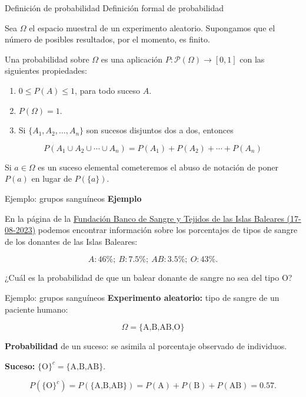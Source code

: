\documentclass[
  ignorenonframetext,
  aspectratio=169]{beamer}
\providecommand{\tightlist}{%
  \setlength{\itemsep}{0pt}\setlength{\parskip}{0pt}}\usepackage{longtable,booktabs,array}
\begin{document}
\begin{frame}{Definición de probabilidad}
\label{definiciuxf3n-de-probabilidad-1}
Definición formal de probabilidad

Sea \(\Omega\) el espacio muestral de un experimento aleatorio.
Supongamos que el número de posibles resultados, por el momento, es
finito.

Una probabilidad sobre \(\Omega\) es una aplicación
\(P:\mathcal{P}(\Omega)\to [0,1]\) con las siguientes propiedades:

\begin{enumerate}
\tightlist
\item
  \(0\leq P(A)\leq 1\), para todo suceso \(A\).
\item
  \(P(\Omega)=1\).
\item
  Si \(\{A_1,A_2,\ldots,A_n\}\) son sucesos disjuntos dos a dos,
  entonces
\end{enumerate}

\[
P(A_1\cup A_2\cup \cdots \cup A_n)=P(A_1)+P(A_2)+\cdots +P(A_n)
\]

Si \(a\in \Omega\) es un suceso elemental cometeremos el abuso de
notación de poner \(P(a)\) en lugar de \(P(\{a\})\).
\end{frame}

\begin{frame}{Ejemplo: grupos sanguíneos}
\label{ejemplo-grupos-sanguuxedneos}
\textbf{Ejemplo}

En la página de la
\href{http://www.donasang.org/que-es-la-sang/es_frequencies-dels-diferents-grups.html}{Fundación
Banco de Sangre y Tejidos de las Islas Baleares (17-08-2023)} podemos
encontrar información sobre los porcentajes de tipos de sangre de los
donantes de las Islas Baleares:

\[A: 46\%;\  B: 7.5\%;\  AB: 3.5\%;\  O: 43\%.\]

¿Cuál es la probabilidad de que un balear donante de sangre no sea del
tipo O?
\end{frame}

\begin{frame}{Ejemplo: grupos sanguíneos}
\label{ejemplo-grupos-sanguuxedneos-1}
\textbf{Experimento aleatorio:} tipo de sangre de un paciente humano:

\[\Omega=\{\mbox{A,B,AB,O}\}\]

\textbf{Probabilidad} de un suceso: se asimila al porcentaje observado
de individuos.

\textbf{Suceso:} \(\{\mbox{O}\}^c=\{\mbox{A,B,AB}\}\).

\[P(\{\mbox{O}\}^c)\!=\!P(\{\mbox{A,B,AB}\})\!=\!
P(\mbox{A})+P (\mbox{B})+P(\mbox{AB})\!=\!0.57.\]
\end{frame}
\end{document}
